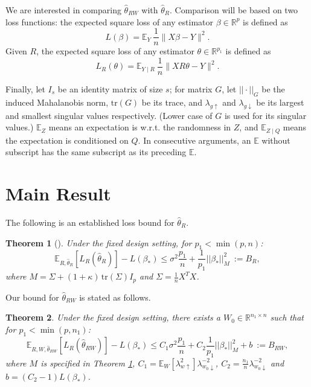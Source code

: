 \documentclass[a4paper,fleqn]{cas-sc}
\theoremstyle{plain}
\newtheorem{theorem}{Theorem}[section]
\newcommand{\R}{\mathbb{R}}
\newcommand{\E}{\mathbb{E}}
\newcommand{\be}{\beta}
\newcommand{\te}{\theta}
\newcommand{\hte}{\hat{\theta}}
\newcommand{\mtr}{\mathrm{tr}}
\begin{document}
We are interested in comparing  
$\hat{\te}_{RW}$ with $\hat{\te}_R$. 
Comparison will be based on 
two loss functions: the 
expected square loss of 
any estimator $\be \in \R^p$
is defined as 
\begin{equation}
L(\be) = \E_{Y}\ \frac{1}{n} 
\parallel X \be - Y \parallel^2. 
\end{equation}
Given $R$, the expected square loss 
of any estimator $\te \in \R^{p_1}$ 
is defined as 
\begin{equation}
L_R(\te) = \E_{Y \mid R}\ \frac{1}{n} 
\parallel X R \te - Y \parallel^2.     
\end{equation}

Finally, 
let $I_s$ be an identity matrix of 
size $s$; for matrix $G$, let 
$||\cdot||_G$ be the induced 
Mahalanobis norm, $\mtr(G)$ be its 
trace, and $\lambda_{g \uparrow}$ 
and $\lambda_{g \downarrow}$ be its 
largest and smallest singular values 
respectively. (Lower case 
of $G$ is used for its singular values.) 
$\E_{Z}$ means an expectation 
is w.r.t. the randomness 
in $Z$, and $\E_{Z \mid Q}$ means 
the expectation is conditioned on $Q$. 
In consecutive arguments, an 
$\E$ without subscript has the 
same subscript as its preceding $\E$.   

\section{Main Result}
\label{sec:mainresult} 

The following is an established
loss bound for $\hat{\te}_R$. 

\begin{theorem}[\cite{kaban2014new}]
\label{thm:rpbound}
Under the fixed design setting, 
for $p_1 < \min(p, n)$: 
\begin{equation}
\E_{R, \hte_R} [L_{R}(\hat{\te}_R)] 
- L(\be_*) \leq \sigma^2 \frac{p_1}{n} 
+ \frac{1}{p_1} || \be_* ||^2_{M}\ 
:= B_R,   
\end{equation}
where $M = \Sigma + (1+\kappa)\, 
\mtr(\Sigma) I_p$ and 
$\Sigma = \frac{1}{n} X^T X$. 
\end{theorem}

Our bound for $\hat{\te}_{RW}$ is 
stated as follows. 

\begin{theorem} 
\label{cor:brpbound}
Under the fixed design setting, 
there exists a 
$W_0 \in \R^{n_1 \times n}$ 
such that for $p_1 < \min(p, n_1)$: 
\begin{equation}
\label{eq:brpbound}
\E_{R, W, \hte_{RW}} 
[L_{R}(\hat{\te}_{RW})] - L(\be_*) 
\leq C_1 \sigma^2 \frac{p_1}{n} 
+ C_2 \frac{1}{p_1} || \be_* ||_{M}^2 
 + b\ := B_{RW},  
\end{equation}
where $M$ is specified in 
Theorem \ref{thm:rpbound}, 
$C_1 = \E_W[\lambda^2_{w \uparrow}]
\lambda^{-2}_{w_0 \downarrow}$,  
$C_2 = \frac{n_1}{n} 
\lambda^{-2}_{w_0 \downarrow}$ 
and $b = (C_2 - 1)L(\be_*)$.
\end{theorem}
\end{document}
